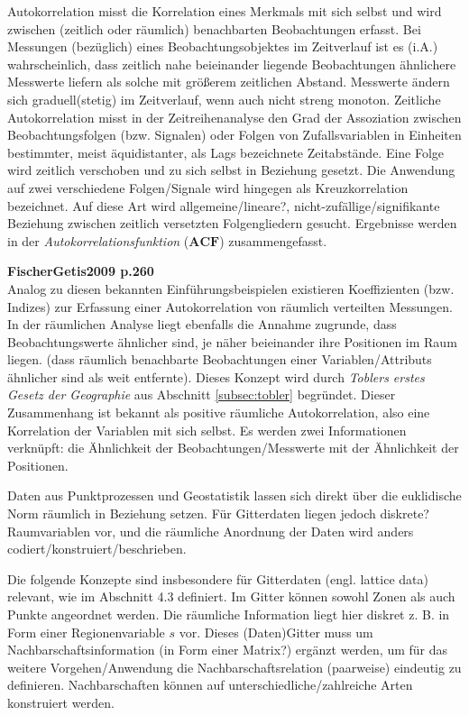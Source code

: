 Autokorrelation misst die Korrelation eines Merkmals mit sich selbst und wird zwischen (zeitlich oder räumlich) 
benachbarten Beobachtungen erfasst. Bei Messungen (bezüglich) eines Beobachtungsobjektes im Zeitverlauf ist es (i.A.) 
wahrscheinlich, dass zeitlich nahe beieinander liegende Beobachtungen ähnlichere Messwerte liefern als solche mit 
größerem zeitlichen Abstand. Messwerte ändern sich graduell(stetig) im Zeitverlauf, wenn auch nicht streng monoton. 
Zeitliche Autokorrelation misst in der Zeitreihenanalyse den Grad der Assoziation zwischen Beobachtungsfolgen 
(bzw. Signalen) oder Folgen von Zufallsvariablen in Einheiten bestimmter, meist äquidistanter, als Lags bezeichnete 
Zeitabstände. Eine Folge wird zeitlich verschoben und zu sich selbst in Beziehung gesetzt. 
Die Anwendung auf zwei verschiedene Folgen/Signale wird hingegen als Kreuzkorrelation bezeichnet. 
Auf diese Art wird allgemeine/lineare?, nicht-zufällige/signifikante Beziehung zwischen zeitlich versetzten 
Folgengliedern gesucht. Ergebnisse werden in der \emph{Autokorrelationsfunktion} ($\mathbf{ACF}$) zusammengefasst.

\textbf{FischerGetis2009 p.260}\\

Analog zu diesen bekannten Einführungsbeispielen existieren Koeffizienten (bzw. Indizes) zur Erfassung einer 
Autokorrelation von räumlich verteilten Messungen. In der räumlichen Analyse liegt ebenfalls die Annahme zugrunde, 
dass Beobachtungswerte ähnlicher sind, je näher beieinander ihre Positionen im Raum liegen.
(dass räumlich benachbarte Beobachtungen einer Variablen/Attributs ähnlicher sind als weit entfernte). 
Dieses Konzept wird durch \emph{Toblers erstes Gesetz der Geographie} aus Abschnitt \ref{subsec:tobler} begründet. 
Dieser Zusammenhang ist bekannt als positive räumliche Autokorrelation, also eine Korrelation der Variablen mit sich selbst. 
Es werden zwei Informationen verknüpft: die Ähnlichkeit der Beobachtungen/Messwerte mit der Ähnlichkeit der Positionen. 


Daten aus Punktprozessen und Geostatistik lassen sich direkt über die euklidische Norm räumlich in Beziehung setzen. 
Für Gitterdaten liegen jedoch diskrete? Raumvariablen vor, und die räumliche Anordnung der Daten wird anders codiert/konstruiert/beschrieben.

Die folgende Konzepte sind insbesondere für Gitterdaten (engl. lattice data) relevant, wie im Abschnitt 4.3 definiert. 
Im Gitter können sowohl Zonen als auch Punkte angeordnet werden. Die räumliche Information liegt hier diskret z. B. in Form 
einer Regionenvariable $s$ vor. Dieses (Daten)Gitter muss um Nachbarschaftsinformation (in Form einer Matrix?) ergänzt werden, 
um für das weitere Vorgehen/Anwendung die Nachbarschaftsrelation (paarweise) eindeutig zu definieren. 
Nachbarschaften können auf unterschiedliche/zahlreiche Arten konstruiert werden. 

